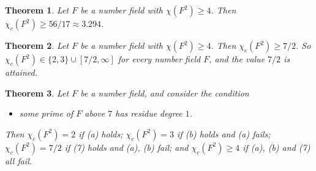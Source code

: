 \documentclass[11pt,a4paper]{amsart}
\newtheorem{theorem}{Theorem}
\theoremstyle{remark}
\begin{document}
\begin{theorem}\label{thm:D}
Let $F$ be a number field with $\chi(F^2)\ge4$. Then $\chi_c(F^2)\ge56/17\approx3.294$.
\end{theorem}

\begin{theorem}\label{thm:E}
Let $F$ be a number field with $\chi(F^2)\ge4$. Then $\chi_c(F^2)\ge7/2$. So $\chi_c(F^2)\in\{2,3\}\cup[7/2,\infty]$
for every number field $F$, and the value $7/2$ is attained.
\end{theorem}

\begin{theorem}\label{thm:F}
Let $F$ be a number field, and consider the condition
\begin{itemize}
\item[(7)] some prime of $F$ above $7$ has residue degree $1$.
\end{itemize}
Then $\chi_c(F^2)=2$ if \textup{(a)} holds; $\chi_c(F^2)=3$ if \textup{(b)} holds and \textup{(a)} fails;
$\chi_c(F^2)=7/2$ if \textup{(7)} holds and \textup{(a)}, \textup{(b)} fail; and $\chi_c(F^2)\ge4$ if \textup{(a)},
\textup{(b)} and \textup{(7)} all fail.
\end{theorem}
\end{document}
